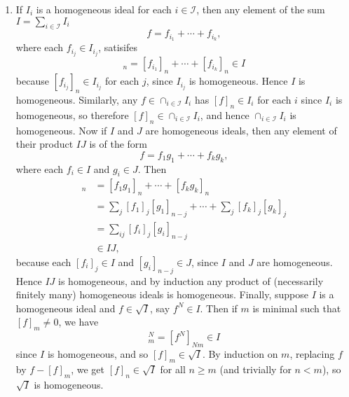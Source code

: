 \documentclass{report}
\newcommand{\rad}[1]{\sqrt{#1}} %
\newcommand{\I}{\mathscr{I}}
\begin{document}
\begin{enumerate}[label=\textbf{4.5.\Alph*.}]
\begin{enumerate}[label=(\alph*)]
		      \item If $I_i$ is a homogeneous ideal for each $i\in\I$, then any
		            element of the sum $I=\sum_{i\in\I}I_i$
		            \begin{equation*}
			            f = f_{i_1} + \cdots + f_{i_k},
		            \end{equation*}
		            where each $f_{i_j}\in I_{i_j}$, satisifes
		            \begin{equation*}
			            [f]_n = [f_{i_1}]_n + \cdots + [f_{i_k}]_n \in I
		            \end{equation*}
		            because $[f_{i_j}]_n\in I_{i_j}$ for each $j$, since $I_{i_j}$
		            is homogeneous. Hence $I$ is homogeneous. Similarly, any
		            $f\in\cap_{i\in\I}I_i$ has $[f]_n\in I_i$ for each $i$ since
		            $I_i$ is homogeneous, so therefore $[f]_n\in\cap_{i\in\I}I_i$,
		            and hence $\cap_{i\in\I}I_i$ is homogeneous. Now if $I$ and $J$
		            are homogeneous ideals, then any element of their product $IJ$
		            is of the form
		            \begin{equation*}
			            f = f_1g_1 + \cdots + f_kg_k,
		            \end{equation*}
		            where each $f_i\in I$ and $g_i\in J$. Then
		            \begin{align*}
			            [f]_n
			             & = [f_1g_1]_n + \cdots + [f_kg_k]_n  \\
			             & = \sum_j[f_1]_j[g_1]_{n-j} + \cdots
			            + \sum_j[f_k]_j[g_k]_j                 \\
			             & = \sum_{ij}[f_i]_j[g_i]_{n-j}       \\
			             & \in IJ,
		            \end{align*}
		            because each $[f_i]_j\in I$ and $[g_i]_{n-j}\in J$, since $I$
		            and $J$ are homogeneous. Hence $IJ$ is homogeneous, and by
		            induction any product of (necessarily finitely many) homogeneous
		            ideals is homogeneous. Finally, suppose $I$ is a homogeneous
		            ideal and $f\in\rad I$, say $f^N\in I$. Then if $m$ is minimal
		            such that $[f]_m\ne0$, we have
		            \begin{equation*}
			            [f]_m^N = [f^N]_{Nm} \in I
		            \end{equation*}
		            since $I$ is homogeneous, and so $[f]_m\in\rad{I}$. By induction
		            on $m$, replacing $f$ by $f-[f]_m$, we get $[f]_n\in\rad{I}$ for
		            all $n\ge m$ (and trivially for $n<m$), so $\rad{I}$ is
		            homogeneous.


\end{enumerate}
\end{enumerate}
\end{document}
